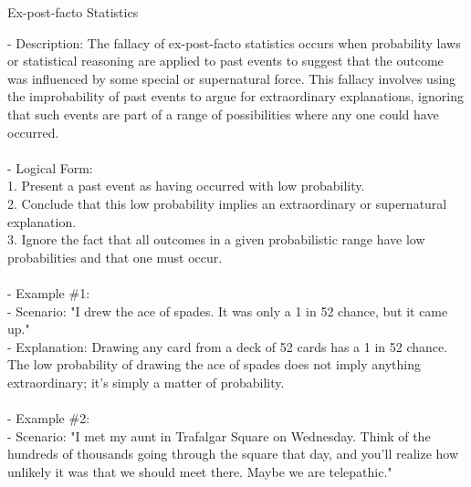 \documentclass[a4paper,12pt,single,pdftex]{scrartcl}
\begin{document}
  

Ex-post-facto Statistics
    
      - Description: The fallacy of ex-post-facto statistics occurs when probability laws or statistical reasoning are applied to past events to suggest that the outcome was influenced by some special or supernatural force. This fallacy involves using the improbability of past events to argue for extraordinary explanations, ignoring that such events are part of a range of possibilities where any one could have occurred.
    \\

    
      
    \\

    
      - Logical Form:
    \\

    
        1. Present a past event as having occurred with low probability.
    \\

    
        2. Conclude that this low probability implies an extraordinary or supernatural explanation.
    \\

    
        3. Ignore the fact that all outcomes in a given probabilistic range have low probabilities and that one must occur.
    \\

    
      
    \\

    
      - Example \#1:
    \\

    
        - Scenario: "I drew the ace of spades. It was only a 1 in 52 chance, but it came up."
    \\

    
        - Explanation: Drawing any card from a deck of 52 cards has a 1 in 52 chance. The low probability of drawing the ace of spades does not imply anything extraordinary; it's simply a matter of probability.
    \\

    
      
    \\

    
      - Example \#2:
    \\

    
        - Scenario: "I met my aunt in Trafalgar Square on Wednesday. Think of the hundreds of thousands going through the square that day, and you’ll realize how unlikely it was that we should meet there. Maybe we are telepathic."
    \\
\end{document}
